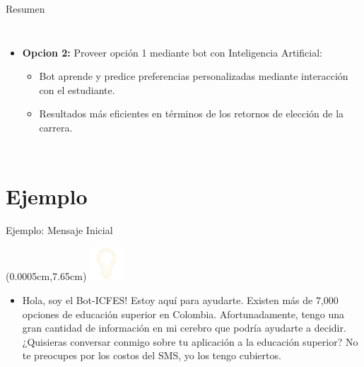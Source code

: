 \documentclass[english,spanish,aspectratio=169,11 pt,utf8]{beamer}	%
\numberwithin{table}{section}
\numberwithin{figure}{section}
\theoremstyle{definition}
\theoremstyle{plain}
\theoremstyle{plain}
\theoremstyle{plain}
\begin{document}
\begin{frame}{Resumen}
\begin{columns}[c]
\begin{itemize}
			\item \textbf{Opcion 2:} Proveer opción 1 mediante bot con Inteligencia Artificial: 
					\begin{itemize}
					\item Bot aprende y predice preferencias personalizadas mediante interacción con el estudiante.
					\item Resultados más eficientes en términos de los retornos de elección de la carrera.
					\end{itemize}
		\end{itemize}
	\end{columns}
\end{frame} %

\section{Ejemplo}
\begin{frame}{Ejemplo: Mensaje Inicial} %
	\begin{textblock*}{1.5cm}(0.0005cm,7.65cm) %
		\includegraphics[width=1.25cm]{header_foco.jpg}
	\end{textblock*}
	\begin{itemize}
		\item Hola, soy el Bot-ICFES! Estoy aquí para ayudarte. Existen más de 7,000 opciones de educación superior en Colombia. Afortunadamente, tengo una gran cantidad de información en mi cerebro que podría ayudarte a decidir. ¿Quisieras conversar conmigo sobre tu aplicación a la educación superior? No te preocupes por los costos del SMS, yo los tengo cubiertos.
	\end{itemize}
\end{frame} %
\end{document}
